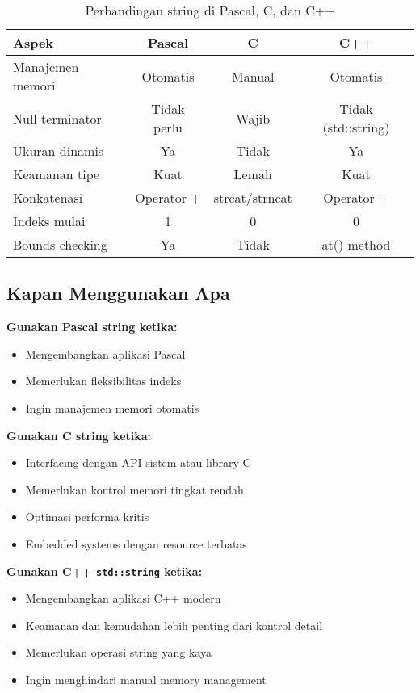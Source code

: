 \documentclass[../main.tex]{subfiles}
\begin{document}
\begin{table}[H]
\centering
\begin{tabular}{|l|c|c|c|}
\hline
\textbf{Aspek} & \textbf{Pascal} & \textbf{C} & \textbf{C++} \\
\hline
Manajemen memori & Otomatis & Manual & Otomatis \\
\hline
Null terminator & Tidak perlu & Wajib & Tidak (std::string) \\
\hline
Ukuran dinamis & Ya & Tidak & Ya \\
\hline
Keamanan tipe & Kuat & Lemah & Kuat \\
\hline
Konkatenasi & Operator + & strcat/strncat & Operator + \\
\hline
Indeks mulai & 1 & 0 & 0 \\
\hline
Bounds checking & Ya & Tidak & at() method \\
\hline
\end{tabular}
\caption{Perbandingan string di Pascal, C, dan C++}
\end{table}

\subsection{Kapan Menggunakan Apa}

\textbf{Gunakan Pascal string ketika:}
\begin{itemize}
  \item Mengembangkan aplikasi Pascal
  \item Memerlukan fleksibilitas indeks
  \item Ingin manajemen memori otomatis
\end{itemize}

\textbf{Gunakan C string ketika:}
\begin{itemize}
  \item Interfacing dengan API sistem atau library C
  \item Memerlukan kontrol memori tingkat rendah
  \item Optimasi performa kritis
  \item Embedded systems dengan resource terbatas
\end{itemize}

\textbf{Gunakan C++ \texttt{std::string} ketika:}
\begin{itemize}
  \item Mengembangkan aplikasi C++ modern
  \item Keamanan dan kemudahan lebih penting dari kontrol detail
  \item Memerlukan operasi string yang kaya
  \item Ingin menghindari manual memory management
\end{itemize}
\end{document}
